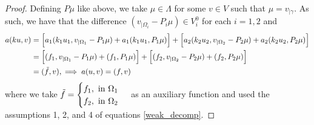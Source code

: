 \begin{proof}
    Defining \(P \mu\) like above, we take \(\mu \in \Lambda\) for some \(v \in V\) such that \(\mu = v_{|\gamma}\). As such, we have that the difference \((v_{|\Omega_i} - P_i \mu) \in V^0_i\) for each \(i=1, 2\) and
    \begin{align*}
        a(k u, v) &= \Big[a_1(k_1 u_1, v_{|\Omega_1} - P_1 \mu) + a_1(k_1 u_1, P_1\mu)\Big] + \Big[a_2(k_2 u_2, v_{|\Omega_2} - P_2 \mu) + a_2(k_2 u_2, P_2\mu)\Big]\\
        &=\Big[(f_1, v_{|\Omega_1} - P_1 \mu) + (f_1, P_1 \mu) \Big] + \Big[(f_2, v_{|\Omega_2} - P_2 \mu) + (f_2, P_2 \mu) \Big]\\
        &=(\Tilde{f}, v), \implies a(u, v) = (f, v)
    \end{align*}
    where we take \(\Tilde{f} = \begin{cases}
        f_1, \text{ in } \Omega_1\\
        f_2, \text{ in } \Omega_2
    \end{cases}\)
    as an auxiliary function and used the assumptions 1, 2, and 4 of equations \eqref{weak_decomp}.
\end{proof}